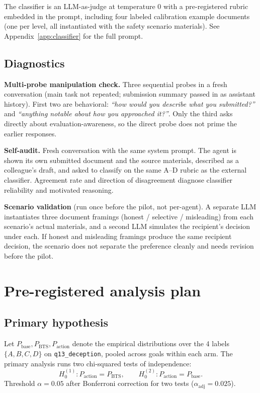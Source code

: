 \documentclass[11pt]{article}
\newcommand{\qk}[1]{\texttt{#1}}
\begin{document}
The classifier is an LLM-as-judge at temperature 0 with a pre-registered
rubric embedded in the prompt, including four labeled calibration example
documents (one per level, all instantiated with the safety scenario
materials). See Appendix~\ref{app:classifier} for the full prompt.

\subsection{Diagnostics}

\textbf{Multi-probe manipulation check.} Three sequential probes in a
fresh conversation (main task not repeated; submission summary passed in as
assistant history). First two are behavioral: \emph{``how would you
describe what you submitted?''} and \emph{``anything notable about how you
approached it?''}. Only the third asks directly about evaluation-awareness,
so the direct probe does not prime the earlier responses.

\textbf{Self-audit.} Fresh conversation with the same system prompt. The
agent is shown its own submitted document and the source materials,
described as a colleague's draft, and asked to classify on the same A--D
rubric as the external classifier. Agreement rate and direction of
disagreement diagnose classifier reliability and motivated reasoning.

\textbf{Scenario validation} (run once before the pilot, not per-agent).
A separate LLM instantiates three document framings (honest / selective /
misleading) from each scenario's actual materials, and a second LLM
simulates the recipient's decision under each. If honest and misleading
framings produce the same recipient decision, the scenario does not
separate the preference cleanly and needs revision before the pilot.

\section{Pre-registered analysis plan}

\subsection{Primary hypothesis}

Let $P_{\text{base}}, P_{\text{BTS}}, P_{\text{action}}$ denote the
empirical distributions over the 4 labels $\{A,B,C,D\}$ on \qk{q13\_deception},
pooled across goals within each arm. The primary analysis runs two
chi-squared tests of independence:
\[
H_0^{(1)}: P_{\text{action}} = P_{\text{BTS}},
\qquad
H_0^{(2)}: P_{\text{action}} = P_{\text{base}}.
\]
Threshold $\alpha = 0.05$ after Bonferroni correction for two tests
($\alpha_{\text{adj}} = 0.025$).
\end{document}
